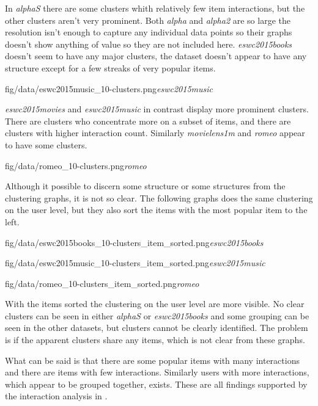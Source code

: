 \FloatBarrier

In \textit{alphaS} there are some clusters whith relatively few item interactions, but the other clusters aren't very prominent. Both \textit{alpha} and \textit{alpha2} are so large the resolution isn't enough to capture any individual data points so their graphs doesn't show anything of value so they are not included here.
\textit{eswc2015books} doesn't seem to have any major clusters, the dataset doesn't appear to have any structure except for a few streaks of very popular items.

{fig/data/eswc2015music_10-clusters.png}{\textit{eswc2015music}}

\textit{eswc2015movies} and \textit{eswc2015music} in contrast display more prominent clusters. There are clusters who concentrate more on a subset of items, and there are clusters with higher interaction count.  Similarly \textit{movielens1m} and \textit{romeo} appear to have some clusters.

{fig/data/romeo_10-clusters.png}{\textit{romeo}}

\FloatBarrier

Although it possible to discern some structure or some structures from the clustering graphs, it is not so clear. The following graphs does the same clustering on the user level, but they also sort the items with the most popular item to the left.

\FloatBarrier

{fig/data/eswc2015books_10-clusters_item_sorted.png}{\textit{eswc2015books}}

{fig/data/eswc2015music_10-clusters_item_sorted.png}{\textit{eswc2015music}}

{fig/data/romeo_10-clusters_item_sorted.png}{\textit{romeo}}

\FloatBarrier

With the items sorted the clustering on the user level are more visible. No clear clusters can be seen in either \textit{alphaS} or \textit{eswc2015books} and some grouping can be seen in the other datasets, but clusters cannot be clearly identified. The problem is if the apparent clusters share any items, which is not clear from these graphs.

What can be said is that there are some popular items with many interactions and there are items with few interactions. Similarly users with more interactions, which appear to be grouped together, exists. These are all findings supported by the interaction analysis in .

